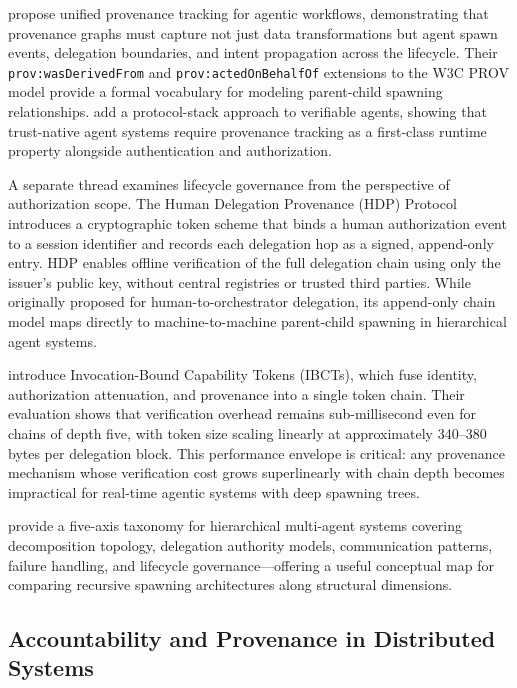  propose unified provenance tracking for agentic workflows, demonstrating that provenance graphs must capture not just data transformations but agent spawn events, delegation boundaries, and intent propagation across the lifecycle. Their \texttt{prov:wasDerivedFrom} and \texttt{prov:actedOnBehalfOf} extensions to the W3C PROV model provide a formal vocabulary for modeling parent-child spawning relationships.  add a protocol-stack approach to verifiable agents, showing that trust-native agent systems require provenance tracking as a first-class runtime property alongside authentication and authorization.

A separate thread examines lifecycle governance from the perspective of authorization scope. The Human Delegation Provenance (HDP) Protocol \citep{draft-helixar-hdp} introduces a cryptographic token scheme that binds a human authorization event to a session identifier and records each delegation hop as a signed, append-only entry. HDP enables offline verification of the full delegation chain using only the issuer's public key, without central registries or trusted third parties. While originally proposed for human-to-orchestrator delegation, its append-only chain model maps directly to machine-to-machine parent-child spawning in hierarchical agent systems.

 introduce Invocation-Bound Capability Tokens (IBCTs), which fuse identity, authorization attenuation, and provenance into a single token chain. Their evaluation shows that verification overhead remains sub-millisecond even for chains of depth five, with token size scaling linearly at approximately 340--380 bytes per delegation block. This performance envelope is critical: any provenance mechanism whose verification cost grows superlinearly with chain depth becomes impractical for real-time agentic systems with deep spawning trees.

 provide a five-axis taxonomy for hierarchical multi-agent systems covering decomposition topology, delegation authority models, communication patterns, failure handling, and lifecycle governance---offering a useful conceptual map for comparing recursive spawning architectures along structural dimensions.

\subsection{Accountability and Provenance in Distributed Systems}
\label{sec:provenance}

